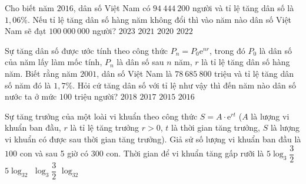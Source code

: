 \begin{ex}%
	Cho biết năm $2016$, dân số Việt Nam có $94~444~200$ người và tỉ lệ tăng dân số là $1{,}06$\%. Nếu tỉ lệ tăng dân số hàng năm không đổi thì vào năm nào dân số Việt Nam sẽ đạt $100~000~000$ người?
	\choice
	{$2023$}
	{$2021$}
	{$2020$}
	{\True $2022$}
	
\end{ex}

\begin{ex}%
	Sự tăng dân số được ước tính theo công thức $P_n=P_0\mathrm{e}^{n r}$, trong đó $P_0$ là dân số của năm lấy làm mốc tính, $P_n$ là dân số sau $n$ năm, $r$ là tỉ lệ tăng dân số hàng năm. Biết rằng năm $2001$, dân số Việt Nam là $78~685~800$ triệu và tỉ lệ tăng dân số năm đó là $1{,}7\%$. Hỏi cứ tăng dân số với tỉ lệ như vậy thì đến năm nào dân số nước ta ở mức $100$ triệu người?
	\choice
	{$2018$}
	{$2017$}
	{$2015$}
	{\True $2016$}
	
\end{ex}

\begin{ex}%
	Sự tăng trưởng của một loài vi khuẩn theo công thức $S=A \cdot \mathrm{e}^{rt}$ ($A$ là lượng vi khuẩn ban đầu, $r$ là tỉ lệ tăng trưởng $r>0$, $t$ là thời gian tăng trưởng, $S$ là lượng vi khuẩn có được sau thời gian tăng trưởng). Giả sử số lượng vi khuẩn ban đầu là $100$ con và sau 5 giờ có $300$ con. Thời gian để vi khuẩn tăng gấp rưỡi là
	\choice
	{\True $5\log_3\dfrac{3}{2}$}
	{$5\log_32$}
	{$\log_3\dfrac{3}{2}$}
	{$\log_32$}
	
\end{ex}

